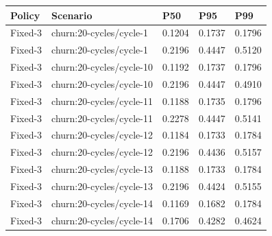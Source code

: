 \begin{tabular}{lllll}
\hline
Policy & Scenario & P50 & P95 & P99 \\
\hline
Fixed-3 & churn:20-cycles/cycle-1 & 0.1204 & 0.1737 & 0.1796 \\
Fixed-3 & churn:20-cycles/cycle-1 & 0.2196 & 0.4447 & 0.5120 \\
Fixed-3 & churn:20-cycles/cycle-10 & 0.1192 & 0.1737 & 0.1796 \\
Fixed-3 & churn:20-cycles/cycle-10 & 0.2196 & 0.4447 & 0.4910 \\
Fixed-3 & churn:20-cycles/cycle-11 & 0.1188 & 0.1735 & 0.1796 \\
Fixed-3 & churn:20-cycles/cycle-11 & 0.2278 & 0.4447 & 0.5141 \\
Fixed-3 & churn:20-cycles/cycle-12 & 0.1184 & 0.1733 & 0.1784 \\
Fixed-3 & churn:20-cycles/cycle-12 & 0.2196 & 0.4436 & 0.5157 \\
Fixed-3 & churn:20-cycles/cycle-13 & 0.1188 & 0.1733 & 0.1784 \\
Fixed-3 & churn:20-cycles/cycle-13 & 0.2196 & 0.4424 & 0.5155 \\
Fixed-3 & churn:20-cycles/cycle-14 & 0.1169 & 0.1682 & 0.1784 \\
Fixed-3 & churn:20-cycles/cycle-14 & 0.1706 & 0.4282 & 0.4624 \\
\hline
\end{tabular}
